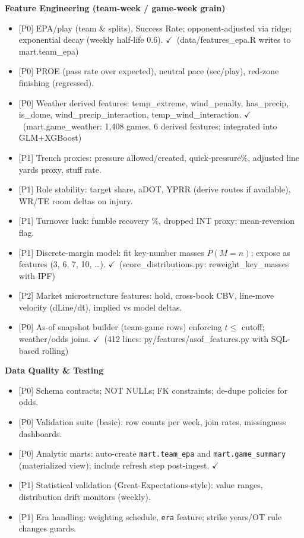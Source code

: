 \documentclass[11pt]{article}
\newcommand{\block}[1]{\par\noindent\textbf{#1}\par\vspace{0.25em}}
\newcommand{\done}{\textcolor{green!60!black}{\(\checkmark\)}}
\newcommand{\prio}[1]{\textcolor{blue!70!black}{[#1]}}
\begin{document}
\block{Feature Engineering (team-week / game-week grain)}
\begin{itemize}
  \item \prio{P0} EPA/play (team \& splits), Success Rate; opponent-adjusted via ridge; exponential decay (weekly half-life 0.6). \done\ (data/features\_epa.R writes to mart.team\_epa)
  \item \prio{P0} PROE (pass rate over expected), neutral pace (sec/play), red-zone finishing (regressed).
  \item \prio{P0} Weather derived features: temp\_extreme, wind\_penalty, has\_precip, is\_dome, wind\_precip\_interaction, temp\_wind\_interaction. \done\ (mart.game\_weather: 1,408 games, 6 derived features; integrated into GLM+XGBoost)
  \item \prio{P1} Trench proxies: pressure allowed/created, quick-pressure\%, adjusted line yards proxy, stuff rate.
  \item \prio{P1} Role stability: target share, aDOT, YPRR (derive routes if available), WR/TE room deltas on injury.
  \item \prio{P1} Turnover luck: fumble recovery \%, dropped INT proxy; mean-reversion flag.
  \item \prio{P1} Discrete-margin model: fit key-number masses $P(M=n)$; expose as features (3, 6, 7, 10, \dots). \done\ (score\_distributions.py: reweight\_key\_masses with IPF)
  \item \prio{P2} Market microstructure features: hold, cross-book CBV, line-move velocity (dLine/dt), implied vs model deltas.
  \item \prio{P0} As-of snapshot builder (team-game rows) enforcing $t\le$ cutoff; weather/odds joins. \done\ (412 lines: py/features/asof\_features.py with SQL-based rolling)
\end{itemize}

\block{Data Quality \& Testing}
\begin{itemize}
  \item \prio{P0} Schema contracts; NOT NULLs; FK constraints; de-dupe policies for odds.
  \item \prio{P0} Validation suite (basic): row counts per week, join rates, missingness dashboards.
  \item \prio{P0} Analytic marts: auto-create \texttt{mart.team\_epa} and \texttt{mart.game\_summary} (materialized view); include refresh step post-ingest. \done
  \item \prio{P1} Statistical validation (Great-Expectations-style): value ranges, distribution drift monitors (weekly).
  \item \prio{P1} Era handling: weighting schedule, \texttt{era} feature; strike years/OT rule changes guards.
\end{itemize}
\end{document}
